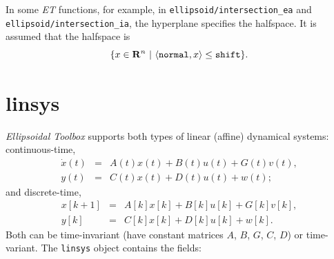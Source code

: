 \documentclass{report}
\begin{document}
In some {\it ET} functions, for example, in {\tt ellipsoid/intersection\_ea}
and {\tt ellipsoid/intersection\_ia}, the hyperplane specifies the halfspace.
It is assumed that the halfspace is
\[ \{ x\in{\bf R}^n ~|~ \langle{\tt normal},x\rangle\leq{\tt shift}\}. \]



\section{linsys}
{\it Ellipsoidal Toolbox}  supports both types of linear (affine)
dynamical systems: continuous-time,
\begin{eqnarray*}
\dot{x}(t) & = & A(t)x(t) + B(t)u(t) + G(t)v(t),\\
y(t) & = & C(t)x(t) + D(t)u(t) + w(t);
\end{eqnarray*}
and discrete-time,
\begin{eqnarray*}
x[k+1] & = & A[k]x[k] + B[k]u[k] + G[k]v[k], \\
y[k] & = & C[k]x[k] + D[k]u[k] + w[k].
\end{eqnarray*}
Both can be time-invariant (have constant matrices $A$, $B$, $G$, $C$, $D$)
or time-variant.
\newline
The {\tt linsys} object contains the fields:
\end{document}
